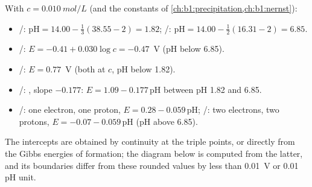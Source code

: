 \begin{example}\label{ex:b1:e-ph-diagrams:iron}
With $c = \qty{0.010}{mol/L}$ (and the constants of \cref{ch:b1:precipitation,ch:b1:nernst}):
\begin{itemize}
  \item {}/: $\mathrm{pH} = 14.00 - \frac13(38.55 - 2) = 1.82$;
        /: $\mathrm{pH} = 14.00 - \frac12(16.31 - 2) = 6.85$.
  \item {}/: $E = -0.41 + 0.030\log c = -0.47$~V (pH below 6.85).
  \item {}/: $E = 0.77$~V (both at $c$, pH below 1.82).
  \item {}/: , slope
        $-0.177$: $E = 1.09 - 0.177\,\mathrm{pH}$ between pH 1.82 and 6.85.
  \item {}/: one electron, one proton, $E = 0.28 -
        0.059\,\mathrm{pH}$; /: two electrons, two
        protons, $E = -0.07 - 0.059\,\mathrm{pH}$ (pH above 6.85).
\end{itemize}
The intercepts are obtained by continuity at the triple points, or
directly from the Gibbs energies of formation; the diagram below is
computed from the latter, and its boundaries differ from these rounded
values by less than \qty{0.01}{V} or 0.01 pH unit.
\end{example}

